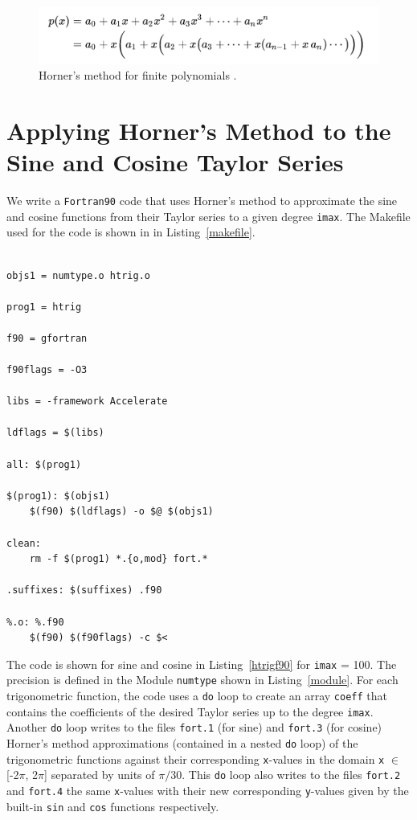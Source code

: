 \documentclass[12pt]{article}
\begin{document}
\begin{figure}[htb]
\includegraphics[width=1.\textwidth]{fig/horner.png}
\caption{Horner's method for finite polynomials \cite{wiki}.}
\label{horner}
\end{figure}

\section{Applying Horner's Method to the Sine and Cosine Taylor Series}

We write a {\tt Fortran90} code that uses Horner's method to approximate the sine and cosine functions from their Taylor series to a given degree {\tt imax}. The Makefile used for the code is shown in in Listing\ \ref{makefile}.

\begin{lstlisting}[frame=single,caption={{\tt Makefile}},label=makefile]

objs1 = numtype.o htrig.o

prog1 = htrig

f90 = gfortran

f90flags = -O3 

libs = -framework Accelerate

ldflags = $(libs)

all: $(prog1)

$(prog1): $(objs1)
	$(f90) $(ldflags) -o $@ $(objs1)

clean: 
	rm -f $(prog1) *.{o,mod} fort.*

.suffixes: $(suffixes) .f90

%.o: %.f90
	$(f90) $(f90flags) -c $<

\end{lstlisting}

The code is shown for sine and cosine in Listing\ \ref{htrigf90} for {\tt imax} = 100. The precision is defined in the Module {\tt numtype} shown in Listing\ \ref{module}. For each trigonometric function, the code uses a {\tt do} loop to create an array {\tt coeff} that contains the coefficients of the desired Taylor series up to the degree {\tt imax}.  Another {\tt do} loop writes to the files {\tt fort.1} (for sine) and {\tt fort.3} (for cosine) Horner's method approximations (contained in a nested {\tt do} loop) of the trigonometric functions against their corresponding {\tt x}-values in the domain {\tt x} $\in$ [-2$\pi$, 2$\pi$] separated by units of $\pi/30$. This {\tt do} loop also writes to the files {\tt fort.2} and {\tt fort.4} the same {\tt x}-values with their new corresponding {\tt y}-values given by the built-in {\tt sin} and {\tt cos} functions respectively.
\end{document}
